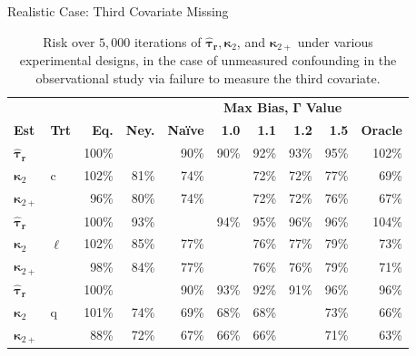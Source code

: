 \documentclass[usenames,dvipsnames]{beamer}
\newcommand{\taur}{\boldsymbol{\hat \tau_r}}
\newcommand{\bskap}{\boldsymbol{ \kappa}}
\theoremstyle{definition} %
\begin{document}
\begin{frame}{Realistic Case: Third Covariate Missing}
\small
\begin{table}[h]
\centering
\begin{tabular}{ll|rrr|rrrr|r}
\toprule
 & & & & &  \multicolumn{4}{c|}{\textbf{Max Bias, }$\boldsymbol \Gamma$ \textbf{Value} } &  \\ 
\textbf{Est}  & \textbf{Trt}    & \textbf{Eq.} & \textbf{Ney.} & \textbf{Naïve} & \textbf{1.0} & \textbf{1.1} & \textbf{1.2} & \textbf{1.5} & \textbf{Oracle} \\ \midrule
$\taur$   & \multirow{3}{*}{c}& 100\% & \textbf{\color{ForestGreen}{90\%}} & 90\% & 90\% & 92\% & 93\% & 95\% & 102\% \\
$\bskap_2$      &  &102\% & 81\% & 74\% & \textbf{\color{ForestGreen}{72\%}} & 72\% & 72\% & 77\% & 69\% \\
$\bskap_{2+}$      &  &96\% & 80\% & 74\% & \textbf{\color{ForestGreen}{71\%}} & 72\% & 72\% & 76\% & 67\% \\ \midrule
$\taur$   & \multirow{3}{*}{$\ell$} & 100\% & 93\% & \textbf{\color{ForestGreen}{93\%}} & 94\% & 95\% & 96\% & 96\% & 104\% \\
$\bskap_2$      & &102\% & 85\% & 77\% & \textbf{\color{ForestGreen}{75\%}} & 76\% & 77\% & 79\% & 73\% \\
$\bskap_{2+}$ & & 98\% & 84\% & 77\% & \textbf{\color{ForestGreen}{75\%}} & 76\% & 76\% & 79\% & 71\% \\ \midrule
$\taur$   & \multirow{3}{*}{q} &100\% & \textbf{\color{ForestGreen}{89\%}} & 90\% & 93\% & 92\% & 91\% & 96\% & 96\% \\
$\bskap_{2}$ & &101\% & 74\% & 69\% & 68\% & 68\% & \textbf{\color{ForestGreen}{67\%}} & 73\% & 66\% \\ 
$\bskap_{2+}$ & &88\% & 72\% & 67\% & 66\% & 66\% & \textbf{\color{ForestGreen}{65\%}} & 71\% & 63\% \\ \bottomrule
 \end{tabular} 
\caption{\label{tab:practical} Risk over $5,000$ iterations of $\taur, \bskap_2$, and $\bskap_{2+}$ under various experimental designs, in the case of unmeasured confounding in the observational study via failure to measure the third covariate.}
\end{table} 
\end{frame}
\end{document}
